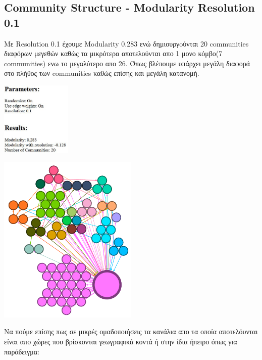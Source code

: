 \documentclass[12pt]{article}
\begin{document}
	\newpage
	\subsection{Community Structure - Modularity Resolution 0.1}
	Με Resolution 0.1 έχουμε Modularity 0.283 ενώ δημιουργoύνται 20 communities διαφόρων μεγεθών καθώς τα μικρότερα αποτελούνται απο 1 μονο κόμβο(7 communities) ενω το μεγαλύτερο απο 26. Όπως βλέπουμε υπάρχει μεγάλη διαφορά στο πλήθος των communities καθώς επίσης και μεγάλη κατανομή.
	\vspace{12pt}
	\begin{center}
		\begin{adjustbox}{valign=t}
			\includegraphics[width=0.25\textwidth]{photos-files/section12/0.1/report.JPG}
		\end{adjustbox}
		\hfill
		\begin{adjustbox}{valign=t}
			\includegraphics[width=0.5\textwidth]{photos-files/section12/0.1/no_label_layout.png}
		\end{adjustbox}
	\end{center}
	
	Να πούμε επίσης πως σε μικρές ομαδοποιήσεις τα κανάλια απο τα οποία αποτελόυνται είναι απο χώρες που βρίσκονται γεωγραφικά κοντά ή στην ίδια ήπειρο όπως για παράδειγμα:
	
\end{document}
